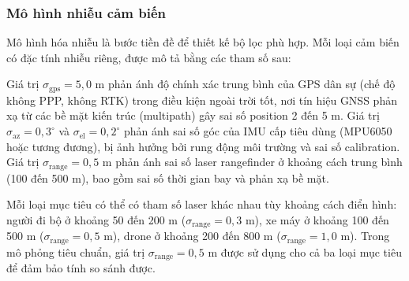 \subsubsection{Mô hình nhiễu cảm biến}

\hspace{0.5cm} Mô hình hóa nhiễu là bước tiền đề để thiết kế bộ lọc phù hợp. Mỗi loại cảm biến có đặc tính nhiễu riêng, được mô tả bằng các tham số sau:

\begin{table}[H]
\centering
\caption{Tham số mô hình nhiễu cảm biến và giá trị sử dụng}
\label{tab:noise-model}
\end{table}

Giá trị $\sigma_{\text{gps}} = 5{,}0$ m phản ánh độ chính xác trung bình của GPS dân sự (chế độ không PPP, không RTK) trong điều kiện ngoài trời tốt, nơi tín hiệu GNSS phản xạ từ các bề mặt kiến trúc (multipath) gây sai số position 2 đến 5 m. Giá trị $\sigma_{\text{az}} = 0{,}3^\circ$ và $\sigma_{\text{el}} = 0{,}2^\circ$ phản ánh sai số góc của IMU cấp tiêu dùng (MPU6050 hoặc tương đương), bị ảnh hưởng bởi rung động môi trường và sai số calibration. Giá trị $\sigma_{\text{range}} = 0{,}5$ m phản ánh sai số laser rangefinder ở khoảng cách trung bình (100 đến 500 m), bao gồm sai số thời gian bay và phản xạ bề mặt.

Mỗi loại mục tiêu có thể có tham số laser khác nhau tùy khoảng cách điển hình: người đi bộ ở khoảng 50 đến 200 m ($\sigma_{\text{range}} = 0{,}3$ m), xe máy ở khoảng 100 đến 500 m ($\sigma_{\text{range}} = 0{,}5$ m), drone ở khoảng 200 đến 800 m ($\sigma_{\text{range}} = 1{,}0$ m). Trong mô phỏng tiêu chuẩn, giá trị $\sigma_{\text{range}} = 0{,}5$ m được sử dụng cho cả ba loại mục tiêu để đảm bảo tính so sánh được.


